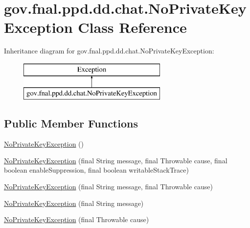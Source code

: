 \hypertarget{classgov_1_1fnal_1_1ppd_1_1dd_1_1chat_1_1NoPrivateKeyException}{\section{gov.\-fnal.\-ppd.\-dd.\-chat.\-No\-Private\-Key\-Exception Class Reference}
\label{classgov_1_1fnal_1_1ppd_1_1dd_1_1chat_1_1NoPrivateKeyException}
}
Inheritance diagram for gov.\-fnal.\-ppd.\-dd.\-chat.\-No\-Private\-Key\-Exception\-:\begin{figure}[H]
\begin{center}
\leavevmode
\includegraphics[height=2.000000cm]{classgov_1_1fnal_1_1ppd_1_1dd_1_1chat_1_1NoPrivateKeyException}
\end{center}
\end{figure}
\subsection*{Public Member Functions}
\begin{DoxyCompactItemize}
\item 
\hyperlink{classgov_1_1fnal_1_1ppd_1_1dd_1_1chat_1_1NoPrivateKeyException_ab013e74f438ba05e54b2b996be1d1d16}{No\-Private\-Key\-Exception} ()
\item 
\hyperlink{classgov_1_1fnal_1_1ppd_1_1dd_1_1chat_1_1NoPrivateKeyException_a919da743806b5eab15186beff5ff3593}{No\-Private\-Key\-Exception} (final String message, final Throwable cause, final boolean enable\-Suppression, final boolean writable\-Stack\-Trace)
\item 
\hyperlink{classgov_1_1fnal_1_1ppd_1_1dd_1_1chat_1_1NoPrivateKeyException_a5ed1331f8505b851d132dd0b7aa3c121}{No\-Private\-Key\-Exception} (final String message, final Throwable cause)
\item 
\hyperlink{classgov_1_1fnal_1_1ppd_1_1dd_1_1chat_1_1NoPrivateKeyException_a3ffa7c8308049379103676a72dfd6416}{No\-Private\-Key\-Exception} (final String message)
\item 
\hyperlink{classgov_1_1fnal_1_1ppd_1_1dd_1_1chat_1_1NoPrivateKeyException_ac031a51c8f599d1c7c911aa55e6491c7}{No\-Private\-Key\-Exception} (final Throwable cause)
\end{DoxyCompactItemize}



